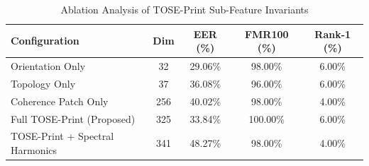 \begin{table}[t]
\centering
\caption{Ablation Analysis of TOSE-Print Sub-Feature Invariants}
\label{tab:ablation}
\begin{tabular}{lcccc}
\hline
Configuration & Dim & EER (\%) & FMR100 (\%) & Rank-1 (\%) \\
\hline
Orientation Only & 32 & 29.06\% & 98.00\% & 6.00\% \\
Topology Only & 37 & 36.08\% & 96.00\% & 6.00\% \\
Coherence Patch Only & 256 & 40.02\% & 98.00\% & 4.00\% \\
Full TOSE-Print (Proposed) & 325 & 33.84\% & 100.00\% & 6.00\% \\
TOSE-Print + Spectral Harmonics & 341 & 48.27\% & 98.00\% & 4.00\% \\
\hline
\end{tabular}
\end{table}
